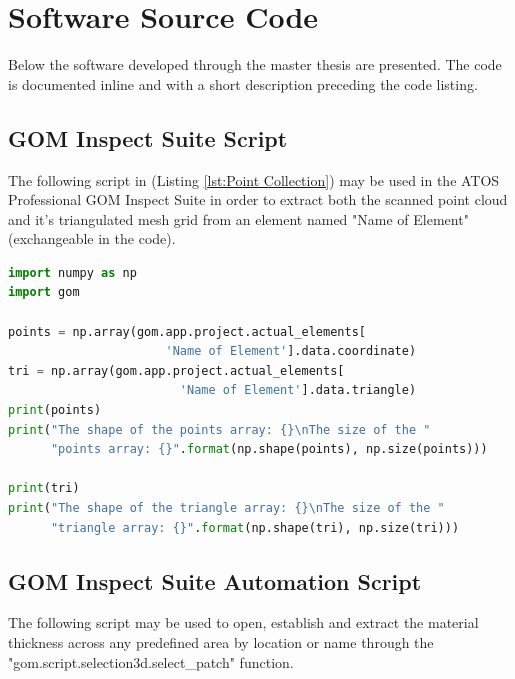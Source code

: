\documentclass[%
]{USN-MSc}
\begin{document}
\chapter{Software Source Code}
\label{app:Software Source Code}
Below the software developed through the master thesis are presented. The code is documented inline and with a short description preceding the code listing.


\section{GOM Inspect Suite Script}
\label{app:GOM Inspect Suite Script}
The following script in (Listing \ref{lst:Point Collection}) may be used in the ATOS Professional GOM Inspect Suite in order to extract both the scanned point cloud and it's triangulated mesh grid from an element named "Name of Element" (exchangeable in the code).

\begin{lstlisting}[language=Python, caption=GOM Point Collection, label={lst:Point Collection}]
import numpy as np
import gom

points = np.array(gom.app.project.actual_elements[
                      'Name of Element'].data.coordinate)
tri = np.array(gom.app.project.actual_elements[
                        'Name of Element'].data.triangle)
print(points)
print("The shape of the points array: {}\nThe size of the "
      "points array: {}".format(np.shape(points), np.size(points)))

print(tri)
print("The shape of the triangle array: {}\nThe size of the "
      "triangle array: {}".format(np.shape(tri), np.size(tri)))
\end{lstlisting}

\clearpage
\section{GOM Inspect Suite Automation Script}
\label{app:GOM Inspect Suite Automation Script}

The following script may be used to open, establish and extract the material thickness across any predefined area by location or name through the "gom.script.selection3d.select\_patch" function.
\end{document}
